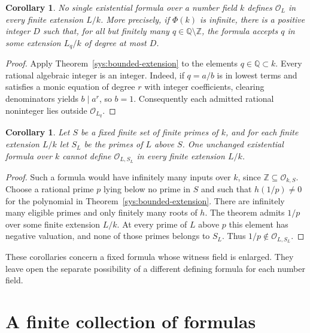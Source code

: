 \documentclass[11pt,a4paper]{article}
\newtheorem{corollary}[theorem]{Corollary}
\theoremstyle{definition}\newtheorem{definition}[theorem]{Definition}
\theoremstyle{remark}\newtheorem{remark}[theorem]{Remark}
\begin{document}
\begin{corollary}\label{sys:no-uniform-integers}
No single existential formula over a number field $k$ defines
$\mathcal O_L$ in every finite extension $L/k$. More precisely,
if $\Phi(k)$ is infinite, there is a positive integer $D$ such
that, for all but finitely many $q\in\mathbb Q\setminus\mathbb Z$,
the formula accepts $q$ in some extension $L_q/k$ of degree at
most $D$.
\end{corollary}
\begin{proof}
Apply Theorem~\ref{sys:bounded-extension} to the elements
$q\in\mathbb Q\subset k$. Every rational algebraic integer is
an integer. Indeed, if $q=a/b$ is in lowest terms and satisfies
a monic equation of degree $r$ with integer coefficients,
clearing denominators yields $b\mid a^r$, so $b=1$.
Consequently each admitted rational noninteger lies outside
$\mathcal O_{L_q}$.
\end{proof}

\begin{corollary}\label{sys:no-uniform-s-integers}
Let $S$ be a fixed finite set of finite primes of $k$, and for
each finite extension $L/k$ let $S_L$ be the primes of $L$
above $S$. One unchanged existential formula over $k$ cannot
define $\mathcal O_{L,S_L}$ in every finite extension $L/k$.
\end{corollary}
\begin{proof}
Such a formula would have infinitely many inputs over $k$,
since $\mathbb Z\subseteq\mathcal O_{k,S}$. Choose a rational
prime $p$ lying below no prime in $S$ and such that $h(1/p)\ne0$
for the polynomial in Theorem~\ref{sys:bounded-extension}.
There are infinitely many eligible primes and only finitely
many roots of $h$. The theorem admits $1/p$ over some finite
extension $L/k$. At every prime of $L$ above $p$ this element
has negative valuation, and none of those primes belongs to
$S_L$. Thus $1/p\notin\mathcal O_{L,S_L}$.
\end{proof}

These corollaries concern a fixed formula whose witness field
is enlarged. They leave open the separate possibility of a
different defining formula for each number field.

\section{A finite collection of formulas}
\end{document}
